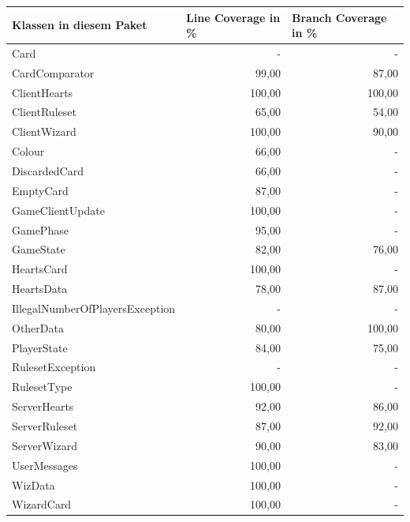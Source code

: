 \documentclass[a4paper]{article}
\begin{document}
\begin{tabular}{|l|r|r|}
\hline
Klassen in diesem Paket & \multicolumn{1}{l|}{Line Coverage in \%} & \multicolumn{1}{l|}{Branch Coverage in \%} \\ \hline \hline
Card & - & - \\ \hline 
CardComparator & 99,00 & \multicolumn{1}{r|}{87,00} \\ \hline
ClientHearts & 100,00 & \multicolumn{1}{r|}{100,00} \\ \hline
ClientRuleset & 65,00 & \multicolumn{1}{r|}{54,00} \\ \hline
ClientWizard & 100,00 & \multicolumn{1}{r|}{90,00} \\ \hline
Colour & 66,00 & - \\ \hline
DiscardedCard & 66,00 & - \\ \hline
EmptyCard & 87,00 & - \\ \hline
GameClientUpdate & 100,00 & - \\ \hline
GamePhase & 95,00 & - \\ \hline
GameState & 82,00 & \multicolumn{1}{r|}{76,00} \\ \hline
HeartsCard & 100,00 & - \\ \hline
HeartsData & 78,00 & \multicolumn{1}{r|}{87,00} \\ \hline
IllegalNumberOfPlayersException & - & - \\ \hline
OtherData & 80,00 & \multicolumn{1}{r|}{100,00} \\ \hline
PlayerState & 84,00 & \multicolumn{1}{r|}{75,00} \\ \hline
RulesetException & - & - \\ \hline
RulesetType & 100,00 & - \\ \hline
ServerHearts & 92,00 & \multicolumn{1}{r|}{86,00} \\ \hline
ServerRuleset & 87,00 & \multicolumn{1}{r|}{92,00} \\ \hline
ServerWizard & 90,00 & \multicolumn{1}{r|}{83,00} \\ \hline
UserMessages & 100,00 & - \\ \hline
WizData & 100,00 & - \\ \hline
WizardCard & 100,00 & - \\ \hline
\end{tabular}
\end{document}
